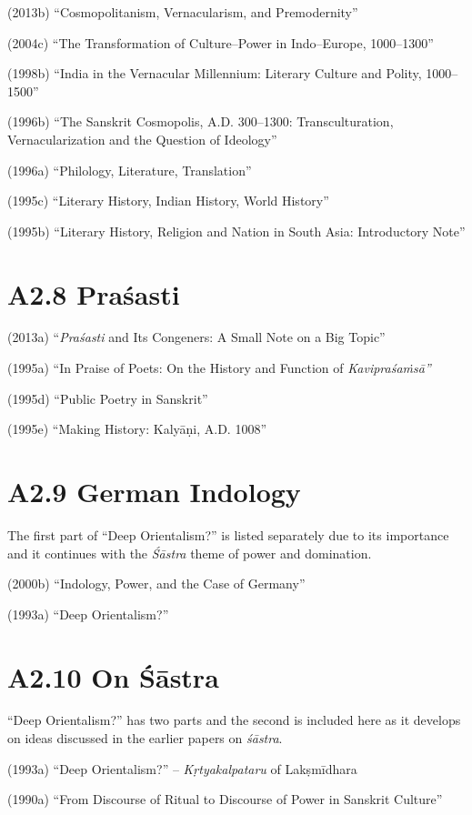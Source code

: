 (2013b) “Cosmopolitanism, Vernacularism, and Premodernity”

(2004c) “The Transformation of Culture–Power in Indo–Europe, 1000–1300”

(1998b) “India in the Vernacular Millennium: Literary Culture and Polity, 1000–1500”

(1996b) “The Sanskrit Cosmopolis, A.D. 300–1300: Transculturation, Vernacularization and the Question of Ideology”

(1996a) “Philology, Literature, Translation”

(1995c) “Literary History, Indian History, World History”

(1995b) “Literary History, Religion and Nation in South Asia: Introductory Note”


\section*{A2.8 Praśasti}

(2013a) “\textit{Praśasti} and Its Congeners: A Small Note on a Big Topic”

(1995a) “In Praise of Poets: On the History and Function of \textit{Kavipraśaṁsā”}

(1995d) “Public Poetry in Sanskrit”

(1995e) “Making History: Kalyāṇi, A.D. 1008”


\section*{A2.9 German Indology}

The first part of “Deep Orientalism?” is listed separately due to its importance and it continues with the \textit{Śāstra} theme of power and domination.

(2000b) “Indology, Power, and the Case of Germany”

(1993a) “Deep Orientalism?”


\section*{A2.10 On Śāstra}

“Deep Orientalism?” has two parts and the second is included here as it develops on ideas discussed in the earlier papers on \textit{śāstra}.

(1993a) “Deep Orientalism?” – \textit{Kṛtyakalpataru} of Lakṣmīdhara

(1990a) “From Discourse of Ritual to Discourse of Power in Sanskrit Culture”

